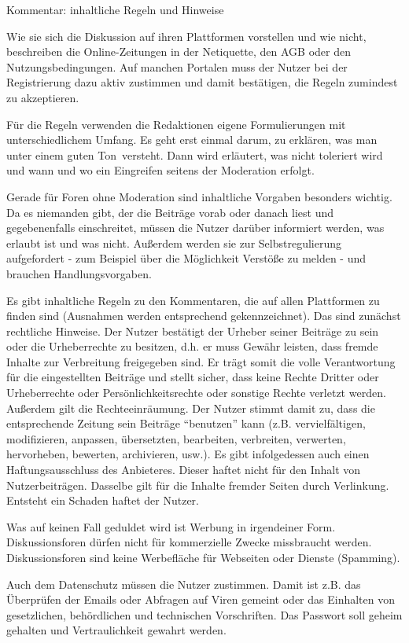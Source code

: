 Kommentar: inhaltliche Regeln und Hinweise

Wie sie sich die Diskussion auf ihren Plattformen vorstellen und wie nicht,
beschreiben die Online-Zeitungen in der Netiquette, den AGB oder den
Nutzungsbedingungen. Auf manchen Portalen muss der Nutzer bei der Registrierung
dazu aktiv zustimmen und damit bestätigen, die Regeln zumindest zu akzeptieren.

Für die Regeln verwenden die Redaktionen eigene Formulierungen mit
unterschiedlichem Umfang. Es geht erst einmal darum, zu erklären, was man unter
einem \glqq guten Ton\grqq\ versteht. Dann wird erläutert, was nicht toleriert
wird und wann und wo ein Eingreifen seitens der Moderation erfolgt.

Gerade für Foren ohne Moderation sind inhaltliche Vorgaben besonders wichtig. Da
es niemanden gibt, der die Beiträge vorab oder danach liest und gegebenenfalls
einschreitet, müssen die Nutzer darüber informiert werden, was erlaubt ist und
was nicht. Außerdem werden sie zur Selbstregulierung aufgefordert - zum Beispiel
über die Möglichkeit Verstöße zu melden - und brauchen Handlungsvorgaben.

Es gibt inhaltliche Regeln zu den Kommentaren, die auf allen Plattformen zu
finden sind (Ausnahmen werden entsprechend gekennzeichnet).  Das sind zunächst
rechtliche Hinweise. Der Nutzer bestätigt der Urheber seiner Beiträge zu sein
oder die Urheberrechte zu besitzen, d.h. er muss Gewähr leisten, dass fremde
Inhalte zur Verbreitung freigegeben sind. Er trägt somit die volle Verantwortung
für die eingestellten Beiträge und stellt sicher, dass keine Rechte Dritter oder
Urheberrechte oder Persönlichkeitsrechte oder sonstige Rechte verletzt werden.
Außerdem gilt die Rechteeinräumung. Der Nutzer stimmt damit zu, dass die
entsprechende Zeitung sein Beiträge ``benutzen'' kann (z.B. vervielfältigen,
modifizieren, anpassen, übersetzten, bearbeiten, verbreiten, verwerten,
hervorheben, bewerten, archivieren, usw.).  Es gibt infolgedessen auch einen
Haftungsausschluss des Anbieteres. Dieser haftet nicht für den Inhalt von
Nutzerbeiträgen. Dasselbe gilt für die Inhalte fremder Seiten durch Verlinkung.
Entsteht ein Schaden haftet der Nutzer.

Was auf keinen Fall geduldet wird ist Werbung in irgendeiner Form.
Diskussionsforen dürfen nicht für kommerzielle Zwecke missbraucht werden.
Diskussionsforen sind keine Werbefläche für Webseiten oder Dienste (Spamming).

Auch dem Datenschutz müssen die Nutzer zustimmen. Damit ist z.B. das Überprüfen
der Emails oder Abfragen auf Viren gemeint oder das Einhalten von gesetzlichen,
behördlichen und technischen Vorschriften. Das Passwort soll geheim gehalten und
Vertraulichkeit gewahrt werden.

